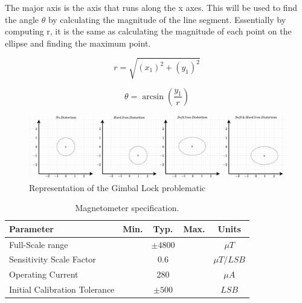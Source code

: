 The major axis is the axis that runs along the x axes. This will be used to find the angle $\theta$ by calculating the magnitude of the line segment. Essentially by computing r, it is the same as calculating the magnitude of each point on the ellipse and finding the maximum point.

\begin{equation}
    r=\sqrt{(x_1)^2+(y_1)^2}
\end{equation}

\begin{equation}
    \theta=\arcsin(\frac{y_1}{r})
\end{equation}

\begin{figure}[!h]
    \centering
    \includegraphics[width=1\textwidth]{figures/magnetometer_distortion.pdf}
    \caption{Representation of the Gimbal Lock problematic}
    \label{fig:gyroscope}
\end{figure}

\begin{table}[H]
    \begin{center}
        \begin{tabular}[t]{lcccc}
            \hline
            Parameter                     & Min. & Typ.       & Max. & Units        \\
            \hline
            Full-Scale range              &      & $\pm 4800$ &      & $\mu T$      \\
            Sensitivity Scale Factor      &      & 0.6        &      & $\mu T/ LSB$ \\
            Operating Current             &      & 280        &      & $\mu A$      \\
            Initial Calibration Tolerance &      & $\pm 500$  &      & $LSB$        \\
            \hline
        \end{tabular}
        \caption{Magnetometer specification. }
        \label{tab:magnetometer_multiplication}
    \end{center}
\end{table}

